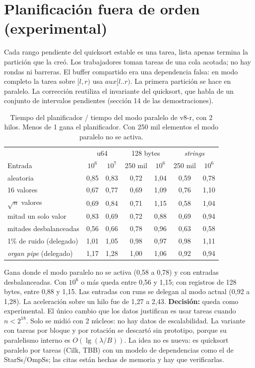 \documentclass[10pt,a4paper]{article}
\begin{document}
\section{Planificación fuera de orden (experimental)}\label{sec:ooo}
Cada rango pendiente del quicksort estable es una tarea, lista apenas termina la
partición que la creó. Los trabajadores toman tareas de una cola acotada; no hay rondas
ni barreras. El buffer compartido era una dependencia falsa: en modo completo la tarea
sobre $[l,r)$ usa $\mathit{aux}[l..r)$. La primera partición se hace en paralelo. La
corrección reutiliza el invariante del quicksort, que habla de un conjunto de
intervalos pendientes (sección 14 de las demostraciones).

\begin{table}[h]\centering\small
\begin{tabular}{lcccccc}
\toprule
 & \multicolumn{2}{c}{u64} & \multicolumn{2}{c}{128 bytes} & \multicolumn{2}{c}{\emph{strings}}\\
Entrada & $10^6$ & $10^7$ & 250 mil & $10^6$ & 250 mil & $10^6$\\
\midrule
aleatoria & 0,85 & 0,83 & 0,72 & 1,04 & 0,59 & 0,78\\
16 valores & 0,67 & 0,77 & 0,69 & 1,09 & 0,76 & 1,10\\
$\sqrt n$ valores & 0,69 & 0,84 & 0,71 & 1,15 & 0,58 & 1,04\\
mitad un solo valor & 0,83 & 0,69 & 0,72 & 0,88 & 0,69 & 0,94\\
mitades desbalanceadas & 0,56 & 0,66 & 0,78 & 0,96 & 0,63 & 0,58\\
1\% de ruido (delegado) & 1,01 & 1,05 & 0,98 & 0,97 & 0,98 & 1,11\\
\emph{organ pipe} (delegado) & 1,17 & 1,28 & 1,00 & 1,06 & 0,92 & 0,94\\
\bottomrule
\end{tabular}
\caption{Tiempo del planificador / tiempo del modo paralelo de v8-r, con 2 hilos. Menos
de 1 gana el planificador. Con 250 mil elementos el modo paralelo no se activa.}\label{tab:ooo}
\end{table}

\noindent Gana donde el modo paralelo no se activa (0,58 a 0,78) y con entradas
desbalanceadas. Con $10^6$ o más queda entre 0,56 y 1,15; con registros de 128 bytes,
entre 0,88 y 1,15. Las entradas con runs se delegan al modo actual (0,92 a 1,28). La
aceleración sobre un hilo fue de 1,27 a 2,43. \textbf{Decisión:} queda como
experimental. El único cambio que los datos justifican es usar tareas cuando
$n<2^{18}$. Solo se midió con 2 núcleos: no hay datos de escalabilidad. La variante con
tareas por bloque y por rotación se descartó sin prototipo, porque su paralelismo
interno es $O(\lg(\lambda/B))$. La idea no es nueva: es quicksort paralelo por tareas
(Cilk, TBB) con un modelo de dependencias como el de StarSs/OmpSs; las citas están
hechas de memoria y hay que verificarlas.
\end{document}
